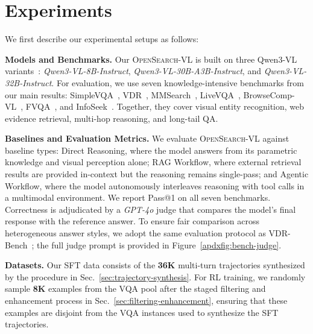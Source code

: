 \section{Experiments}
\label{sec:experiments}

\setlength{\textfloatsep}{2pt plus 1pt minus 1pt}
\setlength{\floatsep}{2pt plus 1pt minus 1pt}
\setlength{\intextsep}{2pt plus 1pt minus 1pt}
\setlength{\dbltextfloatsep}{2pt plus 1pt minus 1pt}
\setlength{\dblfloatsep}{2pt plus 1pt minus 1pt}

We first describe our experimental setups as follows:

\textbf{Models and Benchmarks.}
Our \textsc{OpenSearch-VL} is built on three Qwen3-VL variants~\citep{Qwen3-VL}: \textit{Qwen3-VL-8B-Instruct}, \textit{Qwen3-VL-30B-A3B-Instruct}, and \textit{Qwen3-VL-32B-Instruct}. For evaluation, we use seven knowledge-intensive benchmarks from our main results:  SimpleVQA~\citep{cheng2025simplevqa}, VDR~\citep{vdr}, MMSearch~\citep{mmsearch}, LiveVQA~\citep{fu2025livevqa}, BrowseComp-VL~\citep{webwatcher}, FVQA~\citep{wang2017fvqa}, and InfoSeek~\citep{chen2023can}. Together, they cover visual entity recognition, web evidence retrieval, multi-hop reasoning, and long-tail QA.

\textbf{Baselines and Evaluation Metrics.}
We evaluate \textsc{OpenSearch-VL} against baseline types: Direct Reasoning, where the model answers from its parametric knowledge and visual perception alone; RAG Workflow, where external retrieval results are provided in-context but the reasoning remains single-pass; and Agentic Workflow, where the model autonomously interleaves reasoning with tool calls in a multimodal environment. We report Pass@1 on all seven benchmarks. Correctness is adjudicated by a \textit{GPT-4o} judge that compares the model's final response with the reference answer. To ensure fair comparison across heterogeneous answer styles, we adopt the same evaluation protocol as VDR-Bench~\citep{vdr}; the full judge prompt is provided in Figure~\ref{apdxfig:bench-judge}.

\textbf{Datasets.}
Our SFT data consists of the \textbf{36K} multi-turn trajectories synthesized by the procedure in Sec.~\ref{sec:trajectory-synthesis}. For RL training, we randomly sample \textbf{8K} examples from the VQA pool after the staged filtering and enhancement process in Sec.~\ref{sec:filtering-enhancement}, ensuring that these examples are disjoint from the VQA instances used to synthesize the SFT trajectories. 

